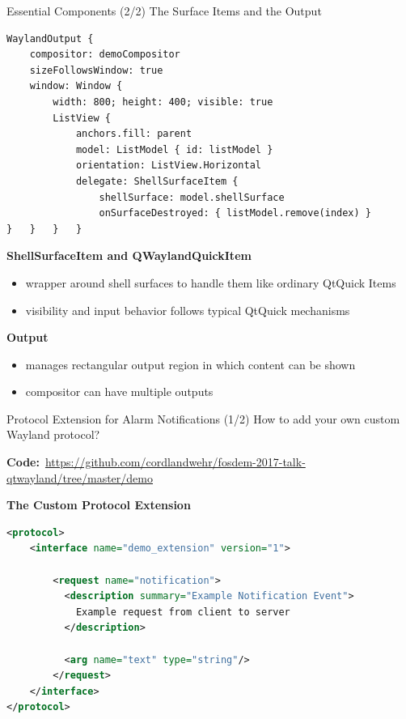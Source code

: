 \documentclass[ucs,9pt]{beamer}
\begin{document}
\begin{frame}[fragile]
    {Essential Components (2/2)}
    {The Surface Items and the Output}

    \vspace{-1em}
    \begin{lstlisting}
WaylandOutput {
    compositor: demoCompositor
    sizeFollowsWindow: true
    window: Window {
        width: 800; height: 400; visible: true
        ListView {
            anchors.fill: parent
            model: ListModel { id: listModel }
            orientation: ListView.Horizontal
            delegate: ShellSurfaceItem {
                shellSurface: model.shellSurface
                onSurfaceDestroyed: { listModel.remove(index) }
}   }   }   }
    \end{lstlisting}
    \vspace{-1em}

    \textbf{ShellSurfaceItem and QWaylandQuickItem}
    \begin{itemize}
        \item wrapper around shell surfaces to handle them like ordinary QtQuick Items
        \item visibility and input behavior follows typical QtQuick mechanisms
    \end{itemize}
    \smallskip

    \textbf{Output}
    \begin{itemize}
        \item manages rectangular output region in which content can be shown
        \item compositor can have multiple outputs
    \end{itemize}
\end{frame}


\begin{frame}[fragile]
    {Protocol Extension for Alarm Notifications (1/2)}
    {How to add your own custom Wayland protocol?}

    \textbf{Code:}\ {\small \url{https://github.com/cordlandwehr/fosdem-2017-talk-qtwayland/tree/master/demo}}
    \bigskip

    \textbf{The Custom Protocol Extension}
\begin{lstlisting}[language=Xml]
<protocol>
    <interface name="demo_extension" version="1">

        <request name="notification">
          <description summary="Example Notification Event">
            Example request from client to server
          </description>

          <arg name="text" type="string"/>
        </request>
    </interface>
</protocol>
\end{lstlisting}
\end{frame}
\end{document}
